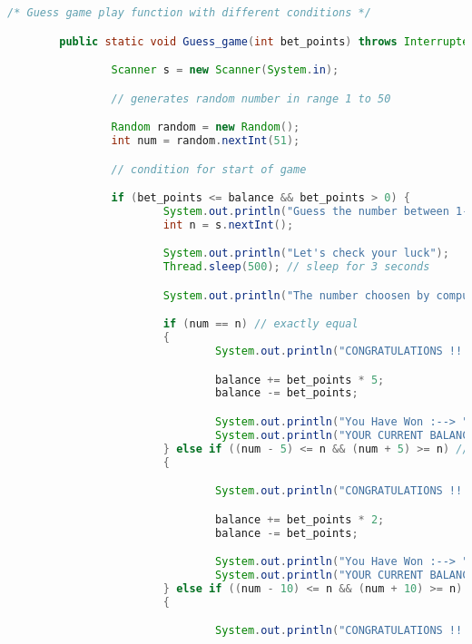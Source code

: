 \documentclass[]{article}
\begin{document}
\begin{lstlisting}[language=Java]
        /* Guess game play function with different conditions */

        public static void Guess_game(int bet_points) throws InterruptedException {

                Scanner s = new Scanner(System.in);

                // generates random number in range 1 to 50

                Random random = new Random();
                int num = random.nextInt(51);

                // condition for start of game

                if (bet_points <= balance && bet_points > 0) {
                        System.out.println("Guess the number between 1-50");
                        int n = s.nextInt();

                        System.out.println("Let's check your luck");
                        Thread.sleep(500); // sleep for 3 seconds

                        System.out.println("The number choosen by computer is " + num);

                        if (num == n) // exactly equal
                        {
                                System.out.println("CONGRATULATIONS !!!!");

                                balance += bet_points * 5;
                                balance -= bet_points;

                                System.out.println("You Have Won :--> " + bet_points * 5);
                                System.out.println("YOUR CURRENT BALANCE --> " + balance);
                        } else if ((num - 5) <= n && (num + 5) >= n) // in range of +5 to -5
                        {

                                System.out.println("CONGRATULATIONS !!!!");

                                balance += bet_points * 2;
                                balance -= bet_points;

                                System.out.println("You Have Won :--> " + bet_points * 2);
                                System.out.println("YOUR CURRENT BALANCE --> " + balance);
                        } else if ((num - 10) <= n && (num + 10) >= n) // in range of +10 to -10
                        {

                                System.out.println("CONGRATULATIONS !!!!");


\end{lstlisting}
\end{document}

